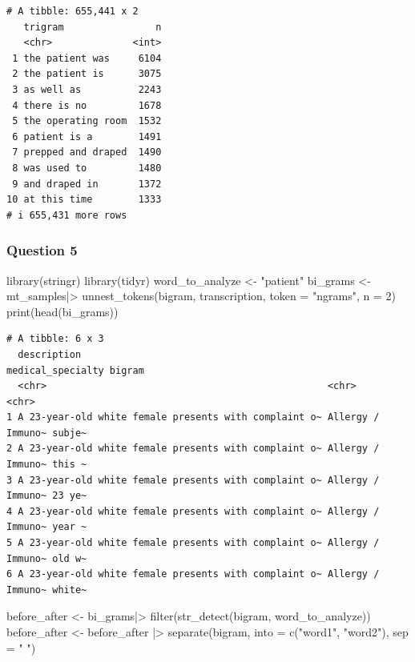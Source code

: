 \documentclass[
  letterpaper,
  DIV=11,
  numbers=noendperiod]{scrartcl}
\newenvironment{Shaded}{\begin{snugshade}}{\end{snugshade}}
\newcommand{\AttributeTok}[1]{\textcolor[rgb]{0.40,0.45,0.13}{#1}}
\newcommand{\DecValTok}[1]{\textcolor[rgb]{0.68,0.00,0.00}{#1}}
\newcommand{\FunctionTok}[1]{\textcolor[rgb]{0.28,0.35,0.67}{#1}}
\newcommand{\NormalTok}[1]{\textcolor[rgb]{0.00,0.23,0.31}{#1}}
\newcommand{\OtherTok}[1]{\textcolor[rgb]{0.00,0.23,0.31}{#1}}
\newcommand{\SpecialCharTok}[1]{\textcolor[rgb]{0.37,0.37,0.37}{#1}}
\newcommand{\StringTok}[1]{\textcolor[rgb]{0.13,0.47,0.30}{#1}}
\begin{document}
\begin{verbatim}
# A tibble: 655,441 x 2
   trigram                n
   <chr>              <int>
 1 the patient was     6104
 2 the patient is      3075
 3 as well as          2243
 4 there is no         1678
 5 the operating room  1532
 6 patient is a        1491
 7 prepped and draped  1490
 8 was used to         1480
 9 and draped in       1372
10 at this time        1333
# i 655,431 more rows
\end{verbatim}

\subsubsection{Question 5}\label{question-5}

\begin{Shaded}
\begin{Highlighting}[]
\FunctionTok{library}\NormalTok{(stringr)}
\FunctionTok{library}\NormalTok{(tidyr)}
\NormalTok{word\_to\_analyze }\OtherTok{\textless{}{-}} \StringTok{"patient"}
\NormalTok{bi\_grams }\OtherTok{\textless{}{-}}\NormalTok{ mt\_samples}\SpecialCharTok{|\textgreater{}}
\FunctionTok{unnest\_tokens}\NormalTok{(bigram, transcription, }\AttributeTok{token =} \StringTok{"ngrams"}\NormalTok{, }\AttributeTok{n =} \DecValTok{2}\NormalTok{) }
\FunctionTok{print}\NormalTok{(}\FunctionTok{head}\NormalTok{(bi\_grams))}
\end{Highlighting}
\end{Shaded}

\begin{verbatim}
# A tibble: 6 x 3
  description                                           medical_specialty bigram
  <chr>                                                 <chr>             <chr> 
1 A 23-year-old white female presents with complaint o~ Allergy / Immuno~ subje~
2 A 23-year-old white female presents with complaint o~ Allergy / Immuno~ this ~
3 A 23-year-old white female presents with complaint o~ Allergy / Immuno~ 23 ye~
4 A 23-year-old white female presents with complaint o~ Allergy / Immuno~ year ~
5 A 23-year-old white female presents with complaint o~ Allergy / Immuno~ old w~
6 A 23-year-old white female presents with complaint o~ Allergy / Immuno~ white~
\end{verbatim}

\begin{Shaded}
\begin{Highlighting}[]
\NormalTok{before\_after }\OtherTok{\textless{}{-}}\NormalTok{ bi\_grams}\SpecialCharTok{|\textgreater{}}
\FunctionTok{filter}\NormalTok{(}\FunctionTok{str\_detect}\NormalTok{(bigram, word\_to\_analyze))}
\NormalTok{before\_after }\OtherTok{\textless{}{-}}\NormalTok{ before\_after }\SpecialCharTok{|\textgreater{}}
\FunctionTok{separate}\NormalTok{(bigram, }\AttributeTok{into =} \FunctionTok{c}\NormalTok{(}\StringTok{"word1"}\NormalTok{, }\StringTok{"word2"}\NormalTok{), }\AttributeTok{sep =} \StringTok{" "}\NormalTok{)}
\end{Highlighting}
\end{Shaded}
\end{document}
